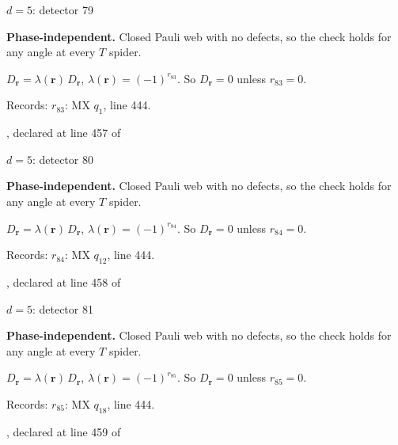 \label{d5_det079}
{\Large $d=5$: detector 79}\par
\textbf{Phase-independent.} Closed Pauli web with no defects, so the check holds for any angle at every $T$ spider.
\begin{center}
\end{center}
\vspace{-1mm}
$D_{\boldsymbol r}=\lambda(\boldsymbol r)\,D_{\boldsymbol r}$, \quad $\lambda(\boldsymbol r)=(-1)^{r_{83}}$. \qquad So $D_{\boldsymbol r}=0$ unless $r_{83}=0$.
\par\smallskip\begin{minipage}{.98\linewidth}\small Records: $r_{83}$: MX $q_{1}$, line 444.\end{minipage}
\vfill
{\footnotesize\texttt{}, declared at line 457 of \texttt{}}
\newpage

\label{d5_det080}
{\Large $d=5$: detector 80}\par
\textbf{Phase-independent.} Closed Pauli web with no defects, so the check holds for any angle at every $T$ spider.
\begin{center}
\end{center}
\vspace{-1mm}
$D_{\boldsymbol r}=\lambda(\boldsymbol r)\,D_{\boldsymbol r}$, \quad $\lambda(\boldsymbol r)=(-1)^{r_{84}}$. \qquad So $D_{\boldsymbol r}=0$ unless $r_{84}=0$.
\par\smallskip\begin{minipage}{.98\linewidth}\small Records: $r_{84}$: MX $q_{12}$, line 444.\end{minipage}
\vfill
{\footnotesize\texttt{}, declared at line 458 of \texttt{}}
\newpage

\label{d5_det081}
{\Large $d=5$: detector 81}\par
\textbf{Phase-independent.} Closed Pauli web with no defects, so the check holds for any angle at every $T$ spider.
\begin{center}
\end{center}
\vspace{-1mm}
$D_{\boldsymbol r}=\lambda(\boldsymbol r)\,D_{\boldsymbol r}$, \quad $\lambda(\boldsymbol r)=(-1)^{r_{85}}$. \qquad So $D_{\boldsymbol r}=0$ unless $r_{85}=0$.
\par\smallskip\begin{minipage}{.98\linewidth}\small Records: $r_{85}$: MX $q_{18}$, line 444.\end{minipage}
\vfill
{\footnotesize\texttt{}, declared at line 459 of \texttt{}}
\newpage

